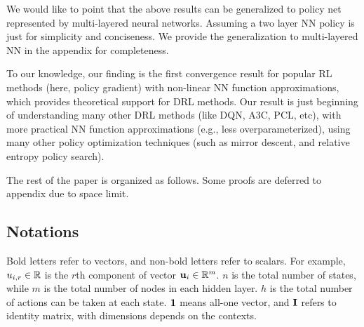 We would like to point that the above results can be generalized to policy net represented by multi-layered neural networks. Assuming a two layer NN policy is just for simplicity and conciseness. We provide the generalization to multi-layered NN in the appendix for completeness.

To our knowledge, our finding is the first convergence result for popular RL methods (here, policy gradient) with non-linear NN function approximations, which provides theoretical support for DRL methods. Our result is just beginning of understanding many other DRL methods (like DQN, A3C, PCL, etc), with more practical NN function approximations (e.g., less overparameterized), using many other policy optimization techniques (such as mirror descent, and relative entropy policy search).

The rest of the paper is organized as follows. Some proofs are deferred to appendix due to space limit.

\subsection{Notations}

Bold letters refer to vectors, and non-bold letters refer to scalars. For example, $u_{i,r} \in {\mathbb{R}}$ is the $r$th component of vector ${\mathbf{u}}_i \in {\mathbb{R}}^m$. $n$ is the total number of states, while $m$ is the total number of nodes in each hidden layer. $h$ is the total number of actions can be taken at each state. ${\mathbf{1}}$ means all-one vector, and ${\mathbf{I}}$ refers to identity matrix, with dimensions depends on the contexts.

